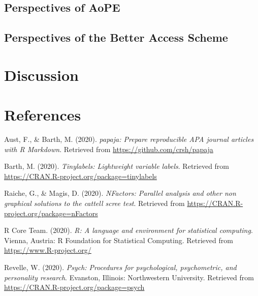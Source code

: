 \documentclass[
  english,
  man]{apa6}
\begin{document}
\hypertarget{perspectives-of-aope}{%
\subsection{Perspectives of AoPE}\label{perspectives-of-aope}}

\hypertarget{perspectives-of-the-better-access-scheme}{%
\subsection{Perspectives of the Better Access Scheme}\label{perspectives-of-the-better-access-scheme}}

\hypertarget{discussion}{%
\section{Discussion}\label{discussion}}

\newpage

\hypertarget{references}{%
\section{References}\label{references}}

\begingroup
\setlength{\parindent}{-0.5in}
\setlength{\leftskip}{0.5in}

\hypertarget{refs}{}
\leavevmode\hypertarget{ref-R-papaja}{}%
Aust, F., \& Barth, M. (2020). \emph{papaja: Prepare reproducible APA journal articles with R Markdown}. Retrieved from \url{https://github.com/crsh/papaja}

\leavevmode\hypertarget{ref-R-tinylabels}{}%
Barth, M. (2020). \emph{Tinylabels: Lightweight variable labels}. Retrieved from \url{https://CRAN.R-project.org/package=tinylabels}

\leavevmode\hypertarget{ref-R-nFactors}{}%
Raiche, G., \& Magis, D. (2020). \emph{NFactors: Parallel analysis and other non graphical solutions to the cattell scree test}. Retrieved from \url{https://CRAN.R-project.org/package=nFactors}

\leavevmode\hypertarget{ref-R-base}{}%
R Core Team. (2020). \emph{R: A language and environment for statistical computing}. Vienna, Austria: R Foundation for Statistical Computing. Retrieved from \url{https://www.R-project.org/}

\leavevmode\hypertarget{ref-R-psych}{}%
Revelle, W. (2020). \emph{Psych: Procedures for psychological, psychometric, and personality research}. Evanston, Illinois: Northwestern University. Retrieved from \url{https://CRAN.R-project.org/package=psych}
\end{document}
